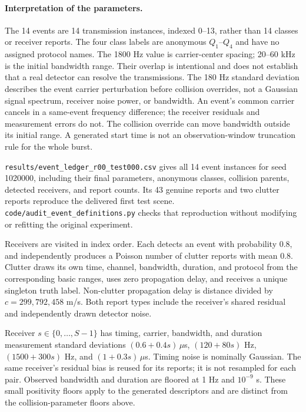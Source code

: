 \documentclass[10pt,a4paper]{article}
\begin{document}
\paragraph{Interpretation of the parameters.}
The 14 events are 14 transmission instances, indexed 0--13, rather than 14 classes or receiver reports. The four class labels are anonymous $Q_1$--$Q_4$ and have no assigned protocol names. The 1800 Hz value is carrier-center spacing; 20--60 kHz is the initial bandwidth range. Their overlap is intentional and does not establish that a real detector can resolve the transmissions. The 180 Hz standard deviation describes the event carrier perturbation before collision overrides, not a Gaussian signal spectrum, receiver noise power, or bandwidth. An event's common carrier cancels in a same-event frequency difference; the receiver residuals and measurement errors do not. The collision override can move bandwidth outside its initial range. A generated start time is not an observation-window truncation rule for the whole burst.

\texttt{results/event\_ledger\_r00\_test000.csv} gives all 14 event instances for seed 1020000, including their final parameters, anonymous classes, collision parents, detected receivers, and report counts. Its 43 genuine reports and two clutter reports reproduce the delivered first test scene. \texttt{code/audit\_event\_definitions.py} checks that reproduction without modifying or refitting the original experiment.

Receivers are visited in index order. Each detects an event with probability 0.8, and independently produces a Poisson number of clutter reports with mean 0.8. Clutter draws its own time, channel, bandwidth, duration, and protocol from the corresponding basic ranges, uses zero propagation delay, and receives a unique singleton truth label. Non-clutter propagation delay is distance divided by $c=299{,}792{,}458$ m/s. Both report types include the receiver's shared residual and independently drawn detector noise.

Receiver $s\in\{0,\ldots,S-1\}$ has timing, carrier, bandwidth, and duration measurement standard deviations $(0.6+0.4s)\,\mu$s, $(120+80s)$ Hz, $(1500+300s)$ Hz, and $(1+0.3s)\,\mu$s. Timing noise is nominally Gaussian. The same receiver's residual bias is reused for its reports; it is not resampled for each pair. Observed bandwidth and duration are floored at 1 Hz and $10^{-9}$ s. These small positivity floors apply to the generated descriptors and are distinct from the collision-parameter floors above.
\end{document}
